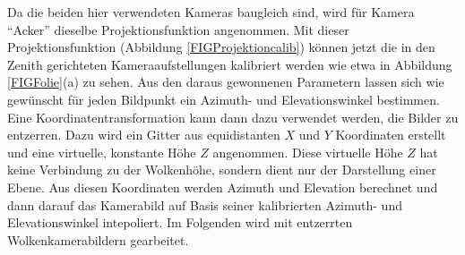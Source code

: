 \documentclass[a4paper,11pt,twoside,german]{article}
\newcommand{\absatz}{\smallbreak}
\begin{document}
Da die beiden hier verwendeten Kameras baugleich sind, wird für Kamera
\enquote{Acker} dieselbe Projektionsfunktion angenommen.  Mit dieser
Projektionsfunktion (Abbildung \ref{FIGProjektioncalib}) können jetzt die in den
Zenith gerichteten Kameraaufstellungen kalibriert werden wie etwa in Abbildung
\ref{FIGFolie}(a) zu sehen. Aus den daraus gewonnenen Parametern lassen sich wie
gewünscht für jeden Bildpunkt ein Azimuth- und Elevationswinkel bestimmen. 
\absatz 
Eine Koordinatentransformation kann dann dazu verwendet werden, die
Bilder zu entzerren. Dazu wird ein Gitter aus equidistanten $X$ und $Y$
Koordinaten erstellt und eine virtuelle, konstante Höhe $Z$ angenommen. Diese
virtuelle Höhe $Z$ hat keine Verbindung zu der Wolkenhöhe, sondern dient nur der
Darstellung einer Ebene. Aus diesen Koordinaten werden Azimuth und Elevation
berechnet und dann darauf das Kamerabild auf Basis seiner kalibrierten Azimuth-
und Elevationswinkel intepoliert.
Im Folgenden wird mit entzerrten Wolkenkamerabildern gearbeitet.
\end{document}
